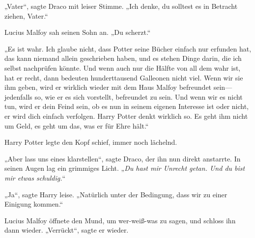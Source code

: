 „Vater“, sagte Draco mit leiser Stimme. „Ich denke, du solltest es in Betracht ziehen, Vater.“

Lucius Malfoy sah seinen Sohn an.
„Du scherzt.“

„Es ist wahr. Ich glaube nicht, dass Potter seine Bücher einfach nur erfunden hat, das kann niemand allein geschrieben haben, und es stehen Dinge darin, die ich selbst nachprüfen könnte. Und wenn auch nur die Hälfte von all dem wahr ist, hat er recht, dann bedeuten hunderttausend Galleonen nicht viel. Wenn wir sie ihm geben, wird er wirklich wieder mit dem Haus Malfoy befreundet sein—jedenfalls so, wie er es sich vorstellt, befreundet zu sein. Und wenn wir es nicht tun, wird er dein Feind sein, ob es nun in seinem eigenen Interesse ist oder nicht, er wird dich einfach verfolgen. Harry Potter denkt wirklich so. Es geht ihm nicht um Geld, es geht um das, was er für Ehre hält.“

Harry Potter legte den Kopf schief, immer noch lächelnd.

„Aber lass uns eines klarstellen“, sagte Draco, der ihn nun direkt anstarrte. In seinen Augen lag ein grimmiges Licht. „\emph{Du hast mir Unrecht getan. \emph{Und} du bist mir etwas schuldig.}“

„Ja“, sagte Harry leise. „Natürlich unter der Bedingung, dass wir zu einer Einigung kommen.“

Lucius Malfoy öffnete den Mund, um wer-weiß-was zu sagen, und schloss ihn dann wieder. „Verrückt“, sagte er wieder.

